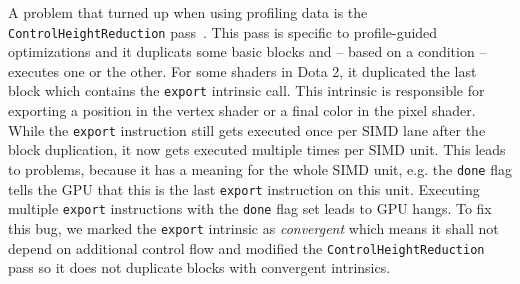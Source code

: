 A problem that turned up when using profiling data is the \texttt{ControlHeightReduction} pass~\cite{ControlHeightReduction}.
This pass is specific to profile-guided optimizations and it duplicats some basic blocks and -- based on a condition -- executes one or the other.
For some shaders in Dota 2, it duplicated the last block which contains the \texttt{export} intrinsic call. This intrinsic is responsible for exporting a position in the vertex shader or a final color in the pixel shader.
While the \texttt{export} instruction still gets executed once per SIMD lane after the block duplication, it now gets executed multiple times per SIMD unit.
This leads to problems, because it has a meaning for the whole SIMD unit, e.g. the \texttt{done} flag tells the GPU that this is the last \texttt{export} instruction on this unit. Executing multiple \texttt{export} instructions with the \texttt{done} flag set leads to GPU hangs.
To fix this bug, we marked the \texttt{export} intrinsic as \emph{convergent} which means it shall not depend on additional control flow and modified the \texttt{ControlHeightReduction} pass so it does not duplicate blocks with convergent intrinsics.
